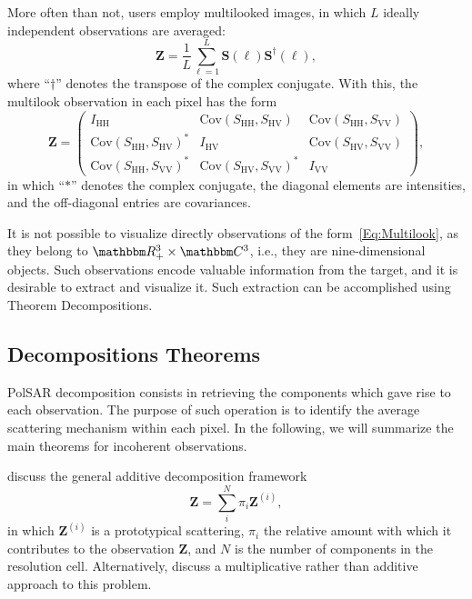 \documentclass[]{interact}
\theoremstyle{plain}%
\theoremstyle{definition}
\theoremstyle{remark}
\begin{document}
More often than not, users employ multilooked images, in which $L$ ideally independent observations are averaged:
\begin{equation}
\bm Z = \frac{1}{L} \sum_{\ell=1}^L \bm S(\ell) \bm S^\dag(\ell),
\end{equation}
where ``$\dag$'' denotes the transpose of the complex conjugate.
With this, the multilook observation in each pixel has the form
\begin{equation}
\bm Z = \begin{pmatrix}
I_{\text{HH}} & \text{Cov}(S_{\text{HH}},S_\text{HV}) & \text{Cov}(S_{\text{HH}},S_\text{VV}) \\
\text{Cov}(S_{\text{HH}},S_\text{HV})^* & I_{\text{HV}} & \text{Cov}(S_{\text{HV}},S_\text{VV})\\
\text{Cov}(S_{\text{HH}},S_\text{VV})^* & \text{Cov}(S_{\text{HV}},S_\text{VV})^* & I_{\text{VV}}
\end{pmatrix},
\label{Eq:Multilook}
\end{equation}
in which ``$*$'' denotes the complex conjugate, the diagonal elements are intensities, and the off-diagonal entries are covariances.

It is not possible to visualize directly observations of the form~\eqref{Eq:Multilook}, as they belong to $\mathbbm R_+^3\times \mathbbm C^3$, i.e., they are nine-dimensional objects.
Such observations encode valuable information from the target, and it is desirable to extract and visualize it.
Such extraction can be accomplished using Theorem Decompositions.

\subsection{Decompositions Theorems}

PolSAR decomposition consists in retrieving the components which gave rise to each observation.
The purpose of such operation is to identify the average scattering mechanism within each pixel.
In the following, we will summarize the main theorems for incoherent observations.

\citet{ModelingandInterpretationofScatteringMechanismsinPolarimetricSyntheticApertureRadarAdvancesandPerspectives2014} discuss the general additive decomposition framework
\begin{equation}
\bm Z = \sum_i^N \pi_i \bm Z^{(i)},
\end{equation}
in which $\bm Z^{(i)}$ is a prototypical scattering, 
$\pi_i$ the relative amount with which it contributes to the observation $\bm Z$, and $N$ is the number of components in the resolution cell.
Alternatively, \citet{APolSARScatteringPowerFactorizationFrameworkandNovelRollInvariantParametersBasedUnsupervisedClassificationSchemeUsingaGeodesicDistanceinpress} discuss a multiplicative rather than additive approach to this problem.
\end{document}
